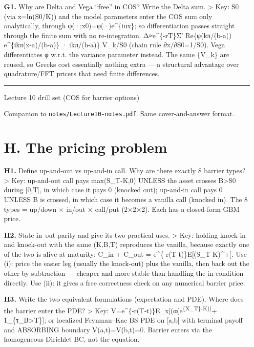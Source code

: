 \documentclass[
  11pt,
]{article}
\begin{document}
\textbf{G1.} Why are Delta and Vega ``free'' in COS? Write the Delta
sum. \textgreater{} Key: S0 (via x=ln(S0/K)) and the model parameters
enter the COS sum only analytically, through φ(·;x0)=φ(·)e\^{}\{iux\};
so differentiation passes straight through the finite sum with no
re-integration. Δ≈e\^{}\{-rT\}Σ' Re\{φ(kπ/(b-a)) e\^{}\{ikπ(x-a)/(b-a)\}
· ikπ/(b-a)\} V\_k/S0 (chain rule ∂x/∂S0=1/S0). Vega differentiates φ
w.r.t. the variance parameter instead. The same \{V\_k\} are reused, so
Greeks cost essentially nothing extra --- a structural advantage over
quadrature/FFT pricers that need finite differences.

\begin{center}\rule{0.5\linewidth}{0.5pt}\end{center}

Lecture 10 drill set (COS for barrier options)

Companion to \texttt{notes/Lecture10-notes.pdf}. Same cover-and-answer
format.

\hypertarget{h.-the-pricing-problem}{%
\section{H. The pricing problem}\label{h.-the-pricing-problem}}

\textbf{H1.} Define up-and-out vs up-and-in call. Why are there exactly
8 barrier types? \textgreater{} Key: up-and-out call pays max(S\_T-K,0)
UNLESS the asset crosses B\textgreater S0 during {[}0,T{]}, in which
case it pays 0 (knocked out); up-and-in call pays 0 UNLESS B is crossed,
in which case it becomes a vanilla call (knocked in). The 8 types =
up/down × in/out × call/put (2×2×2). Each has a closed-form GBM price.

\textbf{H2.} State in--out parity and give its two practical uses.
\textgreater{} Key: holding knock-in and knock-out with the same (K,B,T)
reproduces the vanilla, because exactly one of the two is alive at
maturity: C\_in + C\_out = e\^{}\{-r(T-t)\}E{[}(S\_T-K)\^{}+{]}. Use
(i): price the easier leg (usually the knock-out) plus the vanilla, then
back out the other by subtraction --- cheaper and more stable than
handling the in-condition directly. Use (ii): it gives a free
correctness check on any numerical barrier price.

\textbf{H3.} Write the two equivalent formulations (expectation and
PDE). Where does the barrier enter the PDE? \textgreater{} Key:
V=e\^{}\{-r(T-t)\}E\_x{[}(α(e\textsuperscript{\{X\_T\}-K))}+
1\_\{τ\_B\textgreater T\}{]}; or localized Feynman--Kac BS PDE on
{[}a,b{]} with terminal payoff and ABSORBING boundary V(a,t)=V(b,t)=0.
Barrier enters via the homogeneous Dirichlet BC, not the equation.
\end{document}
